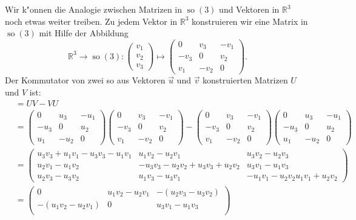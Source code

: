 \begin{beispiel}
Wir k"onnen die Analogie zwischen Matrizen in $\operatorname{so}(3)$ und
Vektoren in $\mathbb R^3$ noch etwas weiter treiben. Zu jedem Vektor
in $\mathbb R^3$ konstruieren wir eine Matrix in $\operatorname{so}(3)$
mit Hilfe der Abbildung
\[
\mathbb R^3\to\operatorname{so}(3)
:
\begin{pmatrix}v_1\\v_2\\v_3\end{pmatrix}
\mapsto
\begin{pmatrix}
  0 & v_3&-v_1\\
-v_3&  0 & v_2\\
 v_1&-v_2&  0
\end{pmatrix}.
\]
Der Kommutator von zwei so aus Vektoren $\vec u$ und $\vec v$
konstruierten Matrizen $U$ und $V$ ist:
\begin{align*}
[U,V]
&=
UV-VU
\\
&=
\begin{pmatrix}
  0 & u_3&-u_1\\
-u_3&  0 & u_2\\
 u_1&-u_2&  0
\end{pmatrix}
\begin{pmatrix}
  0 & v_3&-v_1\\
-v_3&  0 & v_2\\
 v_1&-v_2&  0
\end{pmatrix}
-
\begin{pmatrix}
  0 & v_3&-v_1\\
-v_3&  0 & v_2\\
 v_1&-v_2&  0
\end{pmatrix}
\begin{pmatrix}
  0 & u_3&-u_1\\
-u_3&  0 & u_2\\
 u_1&-u_2&  0
\end{pmatrix}
\\
&=
\begin{pmatrix}
u_3v_3+u_1v_1 - u_3v_3 - u_1v_1
	& u_1v_2 - u_2v_1
		& u_3v_2 - u_2v_3 
\\
u_2v_1 - u_1v_2
	& -u_3v_3-u_2v_2 + u_3v_3+u_2v_2
		& u_3v_1 - u_1v_3
\\
u_2v_3 - u_3v_2         
	& u_1v_3 - u_3v_1
		&-u_1v_1-u_2v_2 u_1v_1+u_2v_2
\end{pmatrix}
\\
&=
\begin{pmatrix}
0
	& u_1v_2 - u_2v_1
		&-(u_2v_3-u_3v_2)
\\
-( u_1v_2 - u_2v_1)
	& 0
		& u_3v_1 - u_1v_3
\\

\end{pmatrix}
\end{align*}
\end{beispiel}
